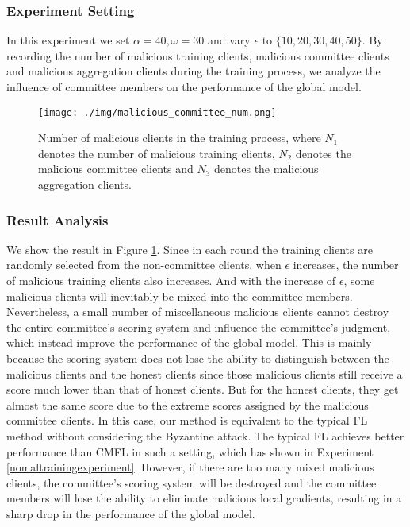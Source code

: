 \documentclass[10pt,journal,compsoc]{IEEEtran}
\begin{document}
\subsubsection{Experiment Setting}

In this experiment we set $\alpha = 40, \omega = 30$ and vary $\epsilon$ to $\{10,20,30,40,50\}$. By recording the number of malicious training clients, malicious committee clients and malicious aggregation clients during the training process, we analyze the influence of committee members on the performance of the global model. 

\begin{figure}
	\centering
	\texttt{[image: ./img/malicious\_committee\_num.png]}
	\caption{Number of malicious clients in the training process, where $N_1$ denotes the number of malicious training clients, $N_2$ denotes the malicious committee clients and $N_3$ denotes the malicious aggregation clients.}
	\label{fig:malicious_committe}
\end{figure}

\subsubsection{Result Analysis}

We show the result in Figure \ref{fig:malicious_committe}. Since in each round the training clients are randomly selected from the non-committee clients, when $\epsilon$ increases, the number of malicious training clients also increases. And with the increase of $\epsilon$, some malicious clients will inevitably be mixed into the committee members. Nevertheless, a small number of miscellaneous malicious clients cannot destroy the entire committee's scoring system and influence the committee's judgment, which instead improve the performance of the global model. This is mainly because the scoring system does not lose the ability to distinguish between the malicious clients and the honest clients since those malicious clients still receive a score much lower than that of honest clients. But for the honest clients, they get almost the same score due to the extreme scores assigned by the malicious committee clients. In this case, our method is equivalent to the typical FL method without considering the Byzantine attack. The typical FL achieves better performance than CMFL in such a setting, which has shown in Experiment \ref{nomaltrainingexperiment}. However, if there are too many mixed malicious clients, the committee's scoring system will be destroyed and the committee members will lose the ability to eliminate malicious local gradients, resulting in a sharp drop in the performance of the global model.  
\end{document}
